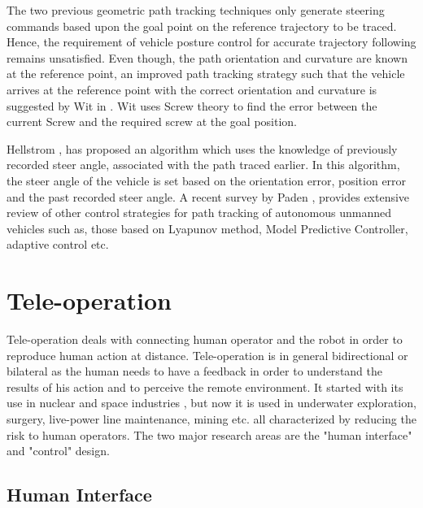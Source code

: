  The two previous geometric path tracking techniques only generate steering commands based upon the goal point on the reference trajectory to be traced. Hence, the requirement of vehicle posture control for accurate trajectory following remains unsatisfied. Even though, the path orientation and curvature are known at the reference point, an improved path tracking strategy such that the vehicle arrives at the reference point  with the correct orientation and curvature is suggested  by Wit in \cite{wit2004autonomous}. Wit uses Screw theory to find the error between the current Screw  and the required screw at the goal position.

Hellstrom \cite{hellstrom2006follow}, has proposed an algorithm which uses the knowledge of previously recorded steer angle, associated with  the path traced earlier. In this algorithm, the steer angle of the vehicle is set based on the orientation error, position error and the past recorded steer angle. A recent survey by Paden \cite{paden2016survey}, provides extensive review of other control strategies for path tracking of autonomous unmanned vehicles such as, those based on Lyapunov method, Model Predictive Controller, adaptive control etc. 


   
\section{Tele-operation}
Tele-operation deals with  connecting   human operator and the robot in order to reproduce human action at distance. Tele-operation is in general bidirectional or bilateral as the human needs to have a feedback in order to understand the results of his action and to perceive the remote environment. It started with its use in nuclear and space industries \cite{martin1985teleoperated,vertut1986teleoperations}, but now it is used in underwater exploration, surgery, live-power line maintenance, mining etc. all characterized by reducing the risk to human operators. The two major research areas are the "human interface" and "control" design.
\subsection{Human Interface}

